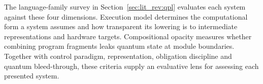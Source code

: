 The language-family survey in Section~\ref{sec:lit_rev:qpl} evaluates each system against these four dimensions.
Execution model determines the computational form a system assumes and how transparent its lowering is to intermediate representations and hardware targets.
Compositional opacity measures whether combining program fragments leaks quantum state at module boundaries.
Together with control paradigm, representation, obligation discipline and quantum bleed-through, these criteria supply an evaluative lens for assessing each presented system.